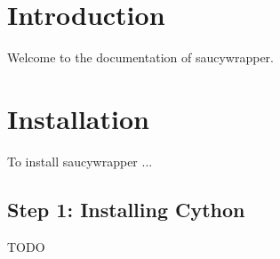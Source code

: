 \hypertarget{index_intro_sec}{}\section{Introduction}\label{index_intro_sec}
Welcome to the documentation of saucywrapper.\hypertarget{index_install_sec}{}\section{Installation}\label{index_install_sec}
To install saucywrapper ... \hypertarget{index_step1}{}\subsection{Step 1\-: Installing Cython}\label{index_step1}
T\-O\-D\-O 